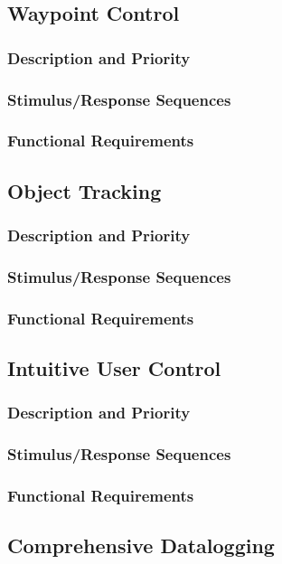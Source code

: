 \documentclass[english]{article}
\numberwithin{equation}{section} %
\begin{document}
\subsection{Waypoint Control}
\subsubsection{Description and Priority}
\subsubsection{Stimulus/Response Sequences}
\subsubsection{Functional Requirements}

\subsection{Object Tracking}
\subsubsection{Description and Priority}
\subsubsection{Stimulus/Response Sequences}
\subsubsection{Functional Requirements}

\subsection{Intuitive User Control}
\subsubsection{Description and Priority}
\subsubsection{Stimulus/Response Sequences}
\subsubsection{Functional Requirements}

\subsection{Comprehensive Datalogging}
\end{document}

